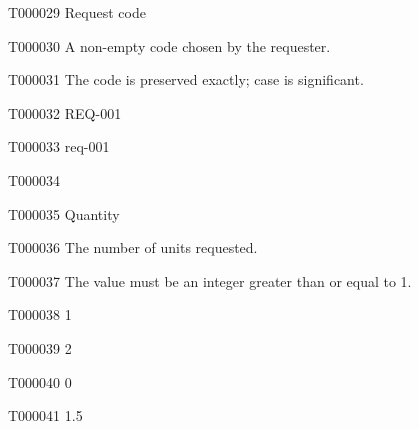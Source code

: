 \documentclass[11pt,a4paper]{article}
\begin{document}
\begin{atlastext}{T000029}
Request code
\end{atlastext}
\begin{atlasparagraph}{T000030}
A non-empty code chosen by the requester.
\end{atlasparagraph}
\begin{atlasparagraph}{T000031}
The code is preserved exactly; case is significant.
\end{atlasparagraph}
\begin{atlasitem}{T000032}
REQ-001
\end{atlasitem}
\begin{atlasitem}{T000033}
req-001
\end{atlasitem}
\begin{atlasitem}{T000034}

\end{atlasitem}
\begin{atlastext}{T000035}
Quantity
\end{atlastext}
\begin{atlasparagraph}{T000036}
The number of units requested.
\end{atlasparagraph}
\begin{atlasparagraph}{T000037}
The value must be an integer greater than or equal to 1.
\end{atlasparagraph}
\begin{atlasitem}{T000038}
1
\end{atlasitem}
\begin{atlasitem}{T000039}
2
\end{atlasitem}
\begin{atlasitem}{T000040}
0
\end{atlasitem}
\begin{atlasitem}{T000041}
1.5
\end{atlasitem}
\end{document}
